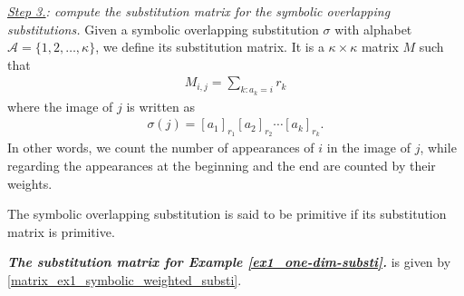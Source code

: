 \documentclass[a4]{amsart}
\theoremstyle{definition}
\begin{document}
\emph{\underline{Step 3.}: compute the substitution matrix for the symbolic overlapping substitutions.}
Given a symbolic overlapping substitution $\sigma$ with alphabet $\mathcal{A}=\{1,2,\ldots ,\kappa\}$, we define its substitution matrix.
It is a $\kappa\times \kappa$ matrix $M$ such that
\begin{align*}
    M_{i,j}=
\sum_{k\colon a_k=i}r_k
\end{align*}
where the image of $j$
is written as
\begin{align*}
    \sigma(j)=[a_1]_{r_1}[a_2]_{r_2}\cdots [a_k]_{r_k}.
\end{align*}
In other words, we count the number of
appearances of $i$ in the image of $j$,
while regarding the appearances at the beginning
and the end are counted by their weights.
 
 The symbolic overlapping substitution is said to be
 primitive if its substitution matrix is
 primitive.
 
{\bf\textit{The substitution matrix for Example
    \ref{ex1_one-dim-substi}.}}  is given by \eqref{matrix_ex1_symbolic_weighted_substi}.
\end{document}
